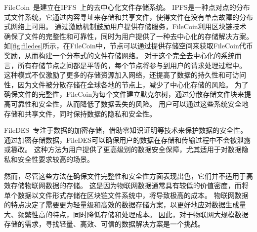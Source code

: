 FileCoin~\cite{bauer2022filecoin}是建立在IPFS~\cite{benet2014ipfs}上的去中心化文件存储系统。
IPFS是一种点对点的分布式文件系统，它通过内容寻址来存储和共享文件，使得文件在没有单点故障的分布式网络上可用。
通过激励机制鼓励用户提供存储服务，FileCoin利用区块链技术确保了文件的完整性和可靠性，同时为用户提供了一种去中心化的存储解决方案。
如\autoref{fig:filedes}所示，在FileCoin中，节点可以通过提供存储空间来获取FileCoin代币奖励，从而构建一个分布式的文件存储网络。
对于这个完全去中心化的系统而言，所有存储节点之间都是平等的，每个节点将参与到用户的请求处理过程中。
这种模式不仅激励了更多的存储资源加入网络，还提高了数据的持久性和可访问性，因为文件被分散存储在全球各地的节点上，减少了中心化存储的风险。
为了确保文件的完整性，FileCoin为每个文件建立默克尔树，通过分散存储文件块来提高可靠性和安全性，从而降低了数据丢失的风险。
用户可以通过这些系统安全地存储和共享文件，同时保持数据的隐私和安全性。

FileDES~\cite{xu2024filedes}专注于数据的加密存储，借助零知识证明等技术来保护数据的安全性。
通过加密存储数据，FileDES可以确保用户的数据在存储和传输过程中不会被泄露或篡改。
这种方法为用户提供了更高级别的数据安全保障，尤其适用于对数据隐私和安全性要求较高的场景。

然而，尽管这些方法在确保文件完整性和安全性方面表现出色，它们并不适用于高效存储物联网数据的存储。
这是因为物联网数据通常具有较低的价值密度，而将单个数据以文件形式存储在区块链文件系统中，将导致极高的成本。
物联网数据的特点决定了需要更为轻量级和高效的数据存储方案，以更好地应对数据生成量大、频繁性高的特点，同时降低存储和处理成本。
因此，对于物联网大规模数据存储的需求，寻找轻量、高效、可信的数据解决方案是一个挑战。

